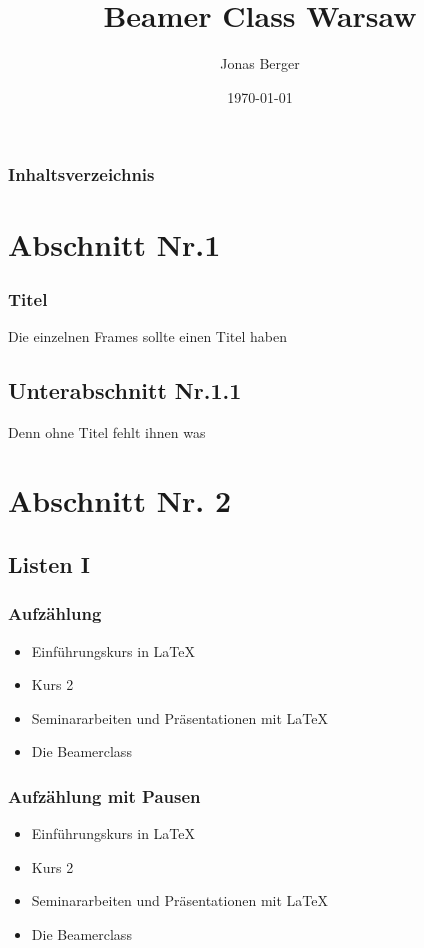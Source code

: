 \documentclass[handout]{beamer} %
\title{Beamer Class Warsaw}
\author{Jonas Berger}
\date{\today}
\begin{document}
	
	\begin{frame}
		\titlepage
	\end{frame} 
	
	\begin{frame}
		\frametitle{Inhaltsverzeichnis}\tableofcontents
	\end{frame} 
	
	
	\section{Abschnitt Nr.1} 
	\begin{frame}
		\frametitle{Titel} 
		Die einzelnen Frames sollte einen Titel haben 
	\end{frame}
	\subsection{Unterabschnitt Nr.1.1  }
	\begin{frame} 
		Denn ohne Titel fehlt ihnen was
	\end{frame}
	
	
	\section{Abschnitt Nr. 2} 
	\subsection{Listen I}
	\begin{frame}\frametitle{Aufz\"ahlung}
		\begin{itemize}
			\item Einf\"uhrungskurs in \LaTeX  
			\item Kurs 2  
			\item Seminararbeiten und Pr\"asentationen mit \LaTeX 
			\item Die Beamerclass 
		\end{itemize} 
	\end{frame}
	
	\begin{frame}\frametitle{Aufz\"ahlung mit Pausen}
		\begin{itemize}
			\item  Einf\"uhrungskurs in \LaTeX \pause 
			\item  Kurs 2 \pause 
			\item  Seminararbeiten und Pr\"asentationen mit \LaTeX \pause 
			\item  Die Beamerclass
		\end{itemize} 
	\end{frame}
	
\end{document}
